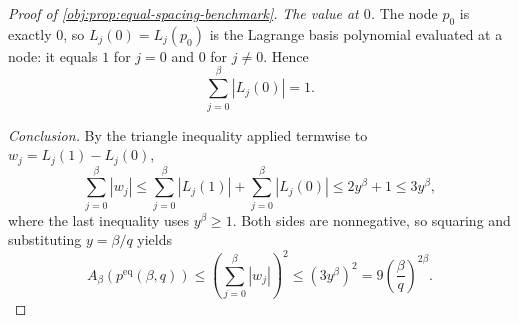 \begin{proof}[Proof of \cref{obj:prop:equal-spacing-benchmark}]
\emph{The value at \(0\).}
The node \(p_0\) is exactly \(0\), so \(L_j(0)=L_j(p_0)\) is the Lagrange basis polynomial evaluated at a node: it equals \(1\) for \(j=0\) and \(0\) for \(j\ne0\). Hence
\[
\sum_{j=0}^{\beta}|L_j(0)|=1.
\] %

\emph{Conclusion.}
By the triangle inequality applied termwise to \(w_j=L_j(1)-L_j(0)\),
\[
\sum_{j=0}^{\beta}|w_j|
\le
\sum_{j=0}^{\beta}|L_j(1)|+\sum_{j=0}^{\beta}|L_j(0)|
\le
2y^\beta+1
\le
3y^\beta,
\]
where the last inequality uses \(y^\beta\ge1\). %
Both sides are nonnegative, so squaring and substituting \(y=\beta/q\) yields
\[
A_\beta\!\left(p^{\mathrm{eq}}(\beta,q)\right)
\le
\left(\sum_{j=0}^{\beta}|w_j|\right)^2
\le
(3y^\beta)^2
=
9\left(\frac{\beta}{q}\right)^{2\beta}.
\] %
\end{proof}
